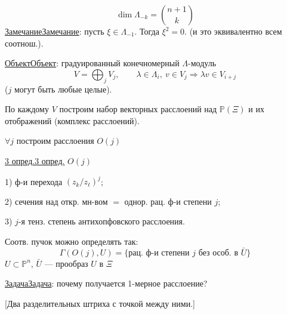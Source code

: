 \documentclass[11pt]{article}
\theoremstyle{definition}
\theoremstyle{remark}
\let\DiplomaticMathUnderline\underline
\renewcommand{\underline}[1]{\ifmmode\DiplomaticMathUnderline{#1}\else\uline{#1}\fi}
\begin{document}
\begin{equation*}
\dim\Lambda_{-k}=\binom{n+1}{k}
\end{equation*}
\underline{Замечание}: пусть $\xi\in\Lambda_{-1}$. Тогда $\xi^2=0$.
(и это эквивалентно всем соотнош.).

\underline{Объект}: градуированный конечномерный $\Lambda$-модуль
\begin{equation*}
V=\bigoplus_j V_j,\qquad
\lambda\in\Lambda_i,\ v\in V_j\Rightarrow\lambda v\in V_{i+j}
\end{equation*}
($j$ могут быть любые целые).

По каждому $V$ построим набор векторных расслоений над $\mathbb{P}(\Xi)$
и их отображений (комплекс расслоений).

$\forall j$ построим расслоения $O(j)$

\underline{3 опред.} $O(j)$

1) ф-и перехода $(z_k/z_\ell)^j$;

2) сечения над откр. мн-вом $=$ однор. рац. ф-и степени $j$;

3) $j$-я тенз. степень антихопфовского расслоения.

Соотв. пучок можно определять так:
\begin{equation*}
\Gamma(O(j),U)=\{\text{рац. ф-и степени }j\text{ без особ. в }\bar U\}
\end{equation*}
$U\subset\mathbb{P}^n$, $\bar U$ — прообраз $U$ в $\Xi$

\underline{Задача}: почему получается 1-мерное расслоение?

[Два разделительных штриха с точкой между ними.]
\end{document}
